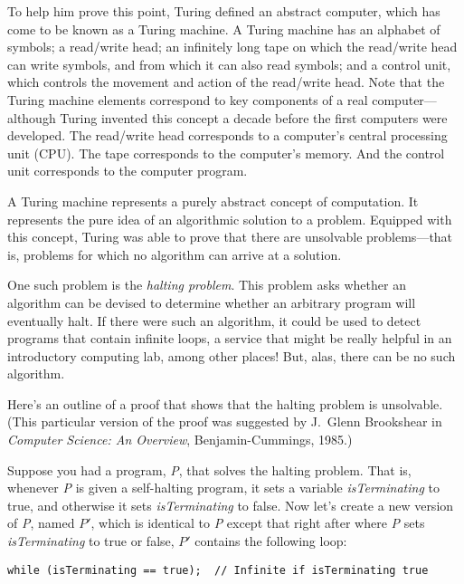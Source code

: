 To help him prove this point, Turing defined an abstract computer,
which has come to be known as a Turing machine. A Turing machine has
an alphabet of symbols; a read/write head; an infinitely long tape on
which the read/write head can write symbols, and from which it can also
read symbols; and a control unit, which controls the movement and
action of the read/write head. Note that the Turing machine
elements correspond to key components of a real computer---although
Turing invented this concept a decade before the first computers were
developed.  The read/write head corresponds to a computer's central
processing unit (CPU).  The tape corresponds to the computer's
memory. And the control unit corresponds to the computer program.

A Turing machine represents a purely abstract concept of computation.
It represents the pure idea of an algorithmic solution to a problem.
Equipped with this concept, Turing was able to prove that there are
unsolvable problems---that is, problems for which no algorithm can
arrive at a solution.

One such problem is the {\it halting problem}. This problem asks
whether an algorithm can be devised to determine whether an arbitrary
program will eventually halt. If there were such an algorithm, it
could be used to detect programs that contain infinite loops, a
service that might be really helpful in an introductory computing lab,
among other places!  But, alas, there can be no such algorithm.

Here's an outline of a proof that shows that the halting
problem is unsolvable. (This particular version of the proof was
suggested by J.~Glenn Brookshear in {\it Computer Science: An
Overview}, Benjamin-Cummings, 1985.)

Suppose you had a program, {\it P}, that solves the halting problem.
That is, whenever {\it P} is given a self-halting program, it
sets a variable {\it isTerminating} to true, and otherwise it
sets {\it isTerminating} to false. Now let's create a new version of
{\it P}, named $P\prime$, which is identical to {\it P} except that
right after where {\it P} sets {\it isTerminating} to true or false,
$P\prime$ contains the following loop:

\begin{jjjlisting}[29pc]
\begin{lstlisting}
while (isTerminating == true);  // Infinite if isTerminating true
\end{lstlisting}
\end{jjjlisting}

